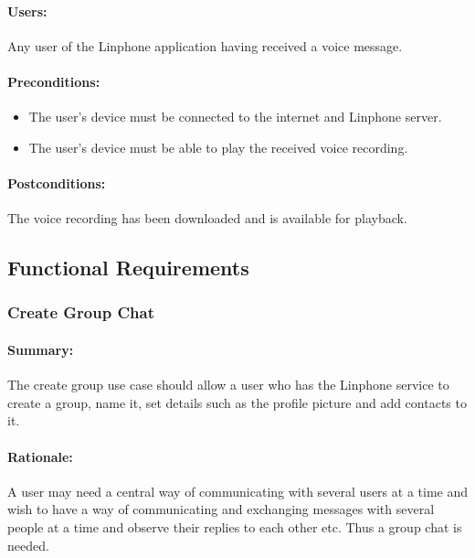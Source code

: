 \documentclass[11pt]{article}
\begin{document}
\paragraph{Users:} Any user of the Linphone application having received a voice message.
\paragraph{Preconditions:} 
\begin{itemize}
\item The user's device must be connected to the internet and Linphone server.
\item The user's device must be able to play the received voice recording.
\end{itemize}
\paragraph{{Postconditions:}} The voice recording has been downloaded and is available for playback.

\subsection{Functional Requirements}
\subsubsection{Create Group Chat} \label{FR-create-group}
\paragraph{Summary:} The create group use case should allow a user who has the Linphone service to create a group, name it, set details such as the profile picture and add contacts to it.
\paragraph{Rationale:} A user may need a central way of communicating with several users at a time and wish to have a way of communicating and exchanging messages with several people at a time and observe their replies to each other etc. Thus a group chat is needed.
\end{document}

